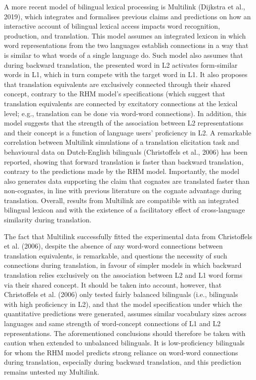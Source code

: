\documentclass[
  english,
  man,floatsintext]{apa6}
\begin{document}
A more recent model of bilingual lexical processing is Multilink (Dijkstra et al., 2019), which integrates and formalises previous claims and predictions on how an interactive account of bilingual lexical access impacts word recognition, production, and translation. This model assumes an integrated lexicon in which word representations from the two languages establish connections in a way that is similar to what words of a single language do. Such model also assumes that during backward translation, the presented word in L2 activates form-similar words in L1, which in turn compete with the target word in L1. It also proposes that translation equivalents are exclusively connected through their shared concept, contrary to the RHM model's specifications (which suggest that translation equivalents are connected by excitatory connections at the lexical level; e.g., translation can be done via word-word connections). In addition, this model suggests that the strength of the association between L2 representations and their concept is a function of language users' proficiency in L2. A remarkable correlation between Multilink simulations of a translation elicitation task and behavioural data on Dutch-English bilinguals (Christoffels et al., 2006) has been reported, showing that forward translation is faster than backward translation, contrary to the predictions made by the RHM model. Importantly, the model also generates data supporting the claim that cognates are translated faster than non-cognates, in line with previous literature on the cognate advantage during translation. Overall, results from Multilink are compatible with an integrated bilingual lexicon and with the existence of a facilitatory effect of cross-language similarity during translation.

The fact that Multilink successfully fitted the experimental data from Christoffels et al. (2006), despite the absence of any word-word connections between translation equivalents, is remarkable, and questions the necessity of such connections during translation, in favour of simpler models in which backward translation relies exclusively on the association between L2 and L1 word forms via their shared concept. It should be taken into account, however, that Christoffels et al. (2006) only tested fairly balanced bilinguals (i.e., bilinguals with high proficiency in L2), and that the model specification under which the quantitative predictions were generated, assumes similar vocabulary sizes across languages and same strength of word-concept connections of L1 and L2 representations. The aforementioned conclusions should therefore be taken with caution when extended to unbalanced bilinguals. It is low-proficiency bilinguals for whom the RHM model predicts strong reliance on word-word connections during translation, especially during backward translation, and this prediction remains untested my Multilink.
\end{document}
